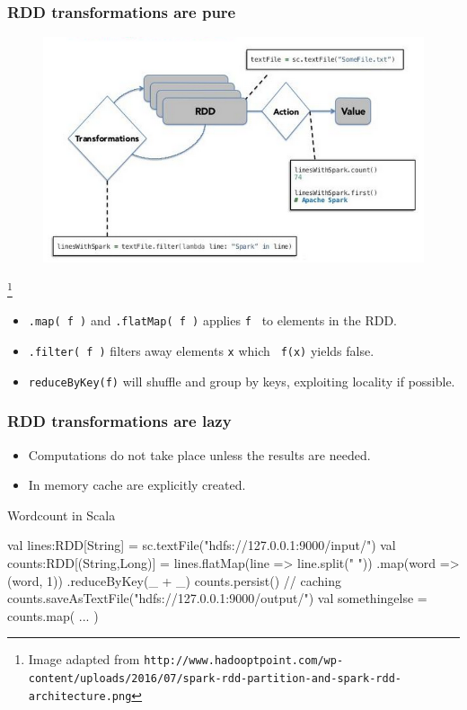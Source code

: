 \documentclass{beamer}
\newcommand{\beb}{\begin{exampleblock}}
\newcommand{\eeb}{\end{exampleblock}}
\begin{document}


\begin{frame}[fragile]
\frametitle{RDD transformations are pure}

\begin{figure}[!htb]
\centering
\includegraphics[scale=0.5]{pic/spark-rdd-partition-and-spark-rdd-architecture.png}
\end{figure}
\footnote{Image adapted from {\tt http://www.hadooptpoint.com/wp-content/uploads/2016/07/spark-rdd-partition-and-spark-rdd-architecture.png}}

\begin{itemize}
\item {\tt .map( f )} and {\tt .flatMap( f )} applies {\tt f } to
  elements in the RDD.
\item {\tt .filter( f )} filters away elements {\tt x} which {\tt
    f(x)} yields false.
\item {\tt reduceByKey(f)} will shuffle and group by keys, exploiting
  locality if possible.
\end{itemize}
\end{frame}





\begin{frame}[fragile]
\frametitle{RDD transformations are lazy}

\begin{itemize}
\item Computations do not take place unless the results are needed.
\item In memory cache are explicitly created.
\end{itemize}
\beb{Wordcount in Scala} 
\begin{code}
val lines:RDD[String] = 
    sc.textFile("hdfs://127.0.0.1:9000/input/")
val counts:RDD[(String,Long)] = 
    lines.flatMap(line => line.split(" "))
    .map(word => (word, 1))
    .reduceByKey(_ + _)
counts.persist() // caching
counts.saveAsTextFile("hdfs://127.0.0.1:9000/output/")
val somethingelse = counts.map( ... )
\end{code} \eeb

\end{frame}
\end{document}
